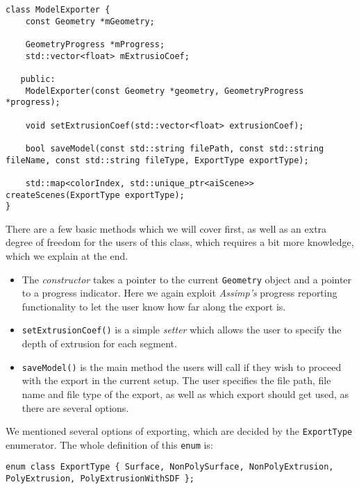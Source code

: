 \begin{lstlisting}
class ModelExporter {
    const Geometry *mGeometry;

    GeometryProgress *mProgress;
    std::vector<float> mExtrusioCoef;

   public:
    ModelExporter(const Geometry *geometry, GeometryProgress *progress);

    void setExtrusionCoef(std::vector<float> extrusionCoef);

    bool saveModel(const std::string filePath, const std::string fileName, const std::string fileType, ExportType exportType);

    std::map<colorIndex, std::unique_ptr<aiScene>> createScenes(ExportType exportType);
}

\end{lstlisting}

There are a few basic methods which we will cover first, as well as an extra degree of freedom for the users of this class, which requires a bit more knowledge, which we explain at the end.

\begin{itemize}

\item The \textit{constructor} takes a pointer to the current \texttt{Geometry} object and a pointer to a progress indicator. Here we again exploit \textit{Assimp's} progress reporting functionality to let the user know how far along the export is.

\item \texttt{setExtrusionCoef()} is a simple \textit{setter} which allows the user to specify the depth of extrusion for each segment.

\item \texttt{saveModel()} is the main method the users will call if they wish to proceed with the export in the current setup. The user specifies the file path, file name and file type of the export, as well as which export should get used, as there are several options.
\end{itemize}

We mentioned several options of exporting, which are decided by the \texttt{ExportType} enumerator. The whole definition of this \texttt{enum} is:

\begin{lstlisting}
enum class ExportType { Surface, NonPolySurface, NonPolyExtrusion, PolyExtrusion, PolyExtrusionWithSDF };
\end{lstlisting}

